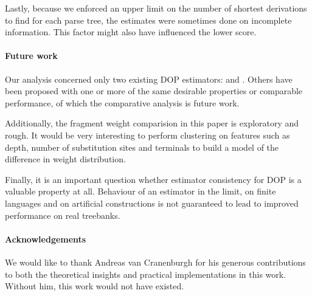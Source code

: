 Lastly, because we enforced an upper limit on the number of shortest derivations to find for each parse tree, the estimates were sometimes done on incomplete information. This factor might also have influenced the lower score.


\paragraph{Future work}
Our analysis concerned only two existing DOP estimators: \ddop{} and \dops{}. Others have been proposed with one or more of the same desirable properties or comparable performance, of which the comparative analysis is future work.

Additionally, the fragment weight comparision in this paper is exploratory and rough. It would be very interesting to perform clustering on features such as depth, number of substitution sites and terminals to build a model of the difference in weight distribution.

Finally, it is an important question whether estimator consistency for DOP is a valuable property at all. Behaviour of an estimator in the limit, on finite languages and on artificial constructions is not guaranteed to lead to improved performance on real treebanks. 

\paragraph{Acknowledgements}
We would like to thank Andreas van Cranenburgh for his generous contributions to both the theoretical insights and practical implementations in this work. Without him, this work would not have existed.
